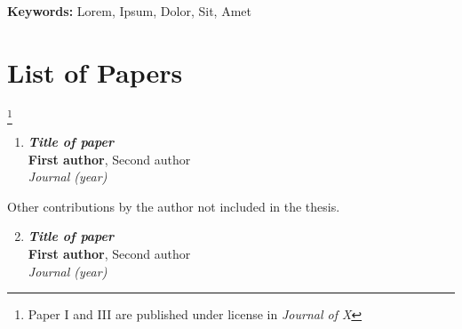 \documentclass[openany,g5paper,electronic]{kthesis}
\begin{document}


\emergencystretch=10pt
\maketitle

\frontmatter %
\begin{abstract}
\noindent \lipsum[1]

\end{abstract}

\bigskip \bigskip \bigskip \bigskip \bigskip

\setlength{\leftskip}{0.3 cm} \textbf {Keywords:} Lorem, Ipsum, Dolor, Sit, Amet

\newpage
{}
\begin{abstract}
\noindent \lipsum[1]
\end{abstract}

\chapter{List of Papers}

\let\thefootnote\relax\footnote{Paper I and III are published under license in \textit{Journal of X}}
\begin{enumerate}[I]
	\item \textbf{\textit{Title of paper}} \\
		\textbf{First author}, Second author \\
		\textit{Journal (year)}
\end{enumerate}

Other contributions by the author not included in the thesis.
\begin{enumerate}[I]
	\setcounter{enumi}{1}
	\item \textbf{\textit{Title of paper}} \\
		\textbf{First author}, Second author \\
		\textit{Journal (year)}
\end{enumerate}
\end{document}
